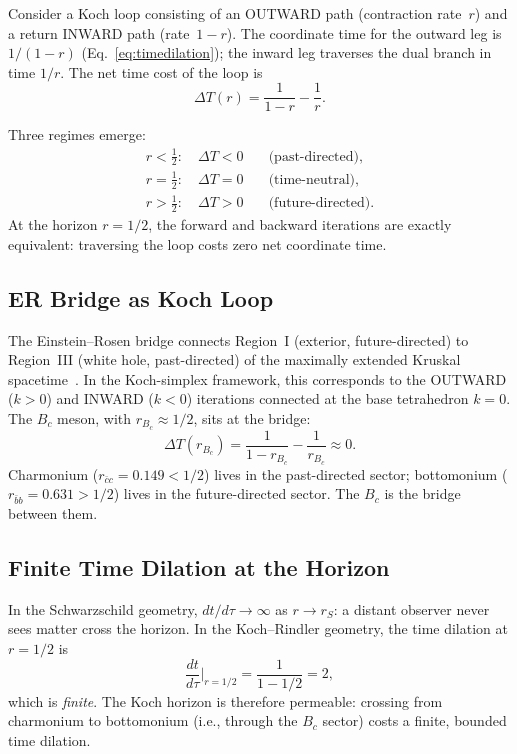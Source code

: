 \documentclass[twocolumn,showpacs,preprintnumbers,amsmath,amssymb,prl]{revtex4-2}
\begin{document}
Consider a Koch loop consisting of an OUTWARD path (contraction
rate~$r$) and a return INWARD path (rate~$1-r$). The coordinate time
for the outward leg is $1/(1-r)$ (Eq.~\ref{eq:timedilation}); the
inward leg traverses the dual branch in time $1/r$. The net
time cost of the loop is
\begin{equation}
    \Delta T(r) = \frac{1}{1-r} - \frac{1}{r}.
    \label{eq:timecost}
\end{equation}

Three regimes emerge:
\begin{align}
    r < \tfrac{1}{2}: \quad \Delta T < 0
        &\quad \text{(past-directed)}, \label{eq:past} \\
    r = \tfrac{1}{2}: \quad \Delta T = 0
        &\quad \text{(time-neutral)}, \label{eq:neutral} \\
    r > \tfrac{1}{2}: \quad \Delta T > 0
        &\quad \text{(future-directed)}. \label{eq:future}
\end{align}
At the horizon $r = 1/2$, the forward and backward iterations are
exactly equivalent: traversing the loop costs zero net coordinate time.

\subsection{ER Bridge as Koch Loop}

The Einstein--Rosen bridge connects Region~I (exterior, future-directed)
to Region~III (white hole, past-directed) of the maximally extended
Kruskal spacetime~\cite{MaldacenaSusskind}. In the Koch-simplex
framework, this corresponds to the OUTWARD ($k > 0$) and
INWARD ($k < 0$) iterations connected at the base tetrahedron $k = 0$.
The $B_c$ meson, with $r_{B_c} \approx 1/2$, sits at the bridge:
\begin{equation}
    \Delta T(r_{B_c}) = \frac{1}{1-r_{B_c}} - \frac{1}{r_{B_c}}
    \approx 0.
    \label{eq:bcbridge}
\end{equation}
Charmonium ($r_{\bar{c}c} = 0.149 < 1/2$) lives in the
past-directed sector; bottomonium ($r_{\bar{b}b} = 0.631 > 1/2$)
lives in the future-directed sector. The $B_c$ is the bridge between them.

\subsection{Finite Time Dilation at the Horizon}

In the Schwarzschild geometry, $dt/d\tau \to \infty$ as $r \to r_S$:
a distant observer never sees matter cross the horizon.
In the Koch--Rindler geometry, the time dilation at $r = 1/2$ is
\begin{equation}
    \frac{dt}{d\tau}\bigg|_{r=1/2} = \frac{1}{1-1/2} = 2,
    \label{eq:horizon_dilation}
\end{equation}
which is \emph{finite}. The Koch horizon is therefore permeable:
crossing from charmonium to bottomonium (i.e., through the $B_c$
sector) costs a finite, bounded time dilation.
\end{document}
